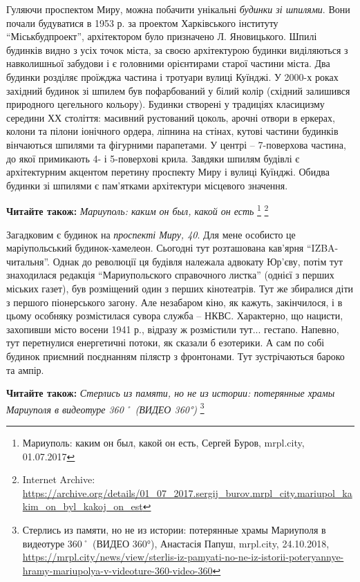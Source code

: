 Гуляючи проспектом Миру, можна побачити унікальні \emph{будинки зі шпилями}. Вони
почали будуватися в 1953 р. за проектом Харківського інституту
\enquote{Міськбудпроект}, архітектором було призначено Л. Яновицького. Шпилі
будинків видно з усіх точок міста, за своєю архітектурою будинки виділяються з
навколишньої забудови і є головними орієнтирами старої частини міста. Два
будинки розділяє проїжджа частина і тротуари вулиці Куїнджі. У 2000-х роках
західний будинок зі шпилем був пофарбований у білий колір (східний залишився
природного цегельного кольору). Будинки створені у традиціях класицизму
середини ХХ століття: масивний рустований цоколь, арочні отвори в еркерах,
колони та пілони іонічного ордера, ліпнина на стінах, кутові частини будинків
вінчаються шпилями та фігурними парапетами. У центрі – 7-поверхова частина, до
якої примикають 4- і 5-поверхові крила. Завдяки шпилям будівлі є архітектурним
акцентом перетину проспекту Миру і вулиці Куїнджі. Обидва будинки зі шпилями є
пам'ятками архітектури місцевого значення.

\textbf{Читайте також:} \emph{Мариуполь: каким он был, какой он есть}%
\footnote{Мариуполь: каким он был, какой он есть, Сергей Буров, mrpl.city, 01.07.2017 } %
\footnote{Internet Archive: \url{https://archive.org/details/01_07_2017.sergij_burov.mrpl_city.mariupol_kakim_on_byl_kakoj_on_est}}


Загадковим є будинок на \emph{проспекті Миру, 40}. Для мене особисто це маріупольський
будинок-хамелеон. Сьогодні тут розташована кав'ярня \enquote{IZBA-читальня}. Однак до
революції ця будівля належала адвокату Юр'єву, потім тут знаходилася редакція
\enquote{Мариупольского справочного листка} (однієї з перших міських газет), був
розміщений один з перших кінотеатрів. Тут же збиралися діти з першого
піонерського загону. Але незабаром кіно, як кажуть, закінчилося, і в цьому
особняку розмістилася сувора служба – НКВС. Характерно, що нацисти, захопивши
місто восени 1941 р., відразу ж розмістили тут... гестапо. Напевно, тут
перетнулися енергетичні потоки, як сказали б езотерики. А сам по собі будинок
приємний поєднанням пілястр з фронтонами. Тут зустрічаються бароко та ампір.

\textbf{Читайте також:} \emph{Стерлись из памяти, но не из истории: потерянные храмы Мариуполя в видеотуре 360˚ (ВИДЕО 360°)}%
\footnote{Стерлись из памяти, но не из истории: потерянные храмы Мариуполя в видеотуре 360˚ (ВИДЕО 360°), Анастасія Папуш, mrpl.city, 24.10.2018, \url{https://mrpl.city/news/view/sterlis-iz-pamyati-no-ne-iz-istorii-poteryannye-hramy-mariupolya-v-videoture-360-video-360}}

